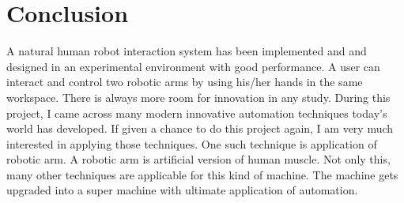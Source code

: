\section{Conclusion}
A natural human robot interaction system has been implemented and  and designed in an experimental environment with good performance. A user can interact and control two robotic arms by using his/her  hands in the same workspace. There is always more room for innovation in any study. During this
project, I came across many modern innovative automation techniques
today’s world has developed. If given a chance to do this project again, I am
very much interested in applying those techniques. One such technique is
application of robotic arm. A robotic arm is artificial version of human
muscle. Not only this, many other techniques are applicable for this kind of
machine. The machine gets upgraded into a super
machine with ultimate application of automation.  